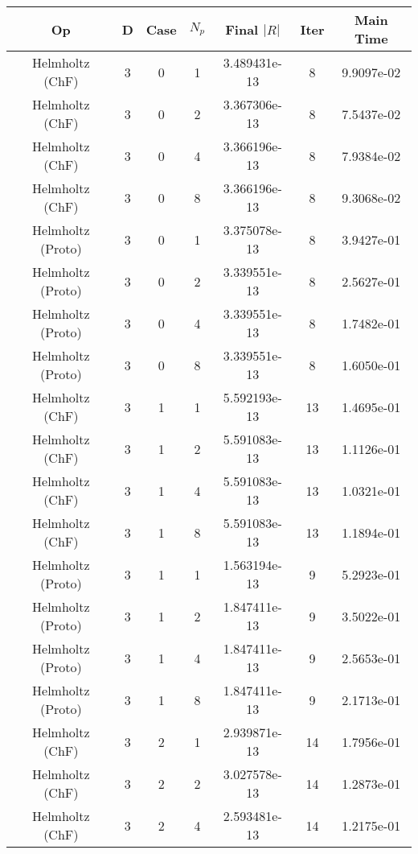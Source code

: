\documentclass{article}
\begin{document}
\begin{small} 
  \begin{table} 
    \begin{center}
      \begin{tabular}{|c|c|c|c|c|c||c|} \hline 
Op & D & Case & $N_p$ & Final $|R|$  &  Iter & Main Time \\  
        \hline 
        Helmholtz       (ChF) & 3 & 0 & 1& 3.489431e-13 & 8 & 9.9097e-02\\
        Helmholtz       (ChF) & 3 & 0 & 2& 3.367306e-13 & 8 & 7.5437e-02\\
        Helmholtz       (ChF) & 3 & 0 & 4& 3.366196e-13 & 8 & 7.9384e-02\\
        Helmholtz       (ChF) & 3 & 0 & 8& 3.366196e-13 & 8 & 9.3068e-02\\
        Helmholtz     (Proto) & 3 & 0 & 1& 3.375078e-13 & 8 & 3.9427e-01\\
        Helmholtz     (Proto) & 3 & 0 & 2& 3.339551e-13 & 8 & 2.5627e-01\\
        Helmholtz     (Proto) & 3 & 0 & 4& 3.339551e-13 & 8 & 1.7482e-01\\
        Helmholtz     (Proto) & 3 & 0 & 8& 3.339551e-13 & 8 & 1.6050e-01\\
        \hline 
        Helmholtz       (ChF) & 3 & 1 & 1& 5.592193e-13 & 13 & 1.4695e-01\\
        Helmholtz       (ChF) & 3 & 1 & 2& 5.591083e-13 & 13 & 1.1126e-01\\
        Helmholtz       (ChF) & 3 & 1 & 4& 5.591083e-13 & 13 & 1.0321e-01\\
        Helmholtz       (ChF) & 3 & 1 & 8& 5.591083e-13 & 13 & 1.1894e-01\\
        Helmholtz     (Proto) & 3 & 1 & 1& 1.563194e-13 & 9 & 5.2923e-01\\
        Helmholtz     (Proto) & 3 & 1 & 2& 1.847411e-13 & 9 & 3.5022e-01\\
        Helmholtz     (Proto) & 3 & 1 & 4& 1.847411e-13 & 9 & 2.5653e-01\\
        Helmholtz     (Proto) & 3 & 1 & 8& 1.847411e-13 & 9 & 2.1713e-01\\
        \hline 
        Helmholtz       (ChF) & 3 & 2 & 1& 2.939871e-13 & 14 & 1.7956e-01\\
        Helmholtz       (ChF) & 3 & 2 & 2& 3.027578e-13 & 14 & 1.2873e-01\\
        Helmholtz       (ChF) & 3 & 2 & 4& 2.593481e-13 & 14 & 1.2175e-01\\

\end{tabular}
\end{center}
\end{table}
\end{small}
\end{document}
